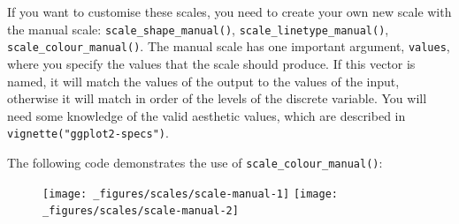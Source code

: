 If you want to customise these scales, you need to create your own new
scale with the manual scale: \texttt{scale\_shape\_manual()},
\texttt{scale\_linetype\_manual()}, \texttt{scale\_colour\_manual()}.
The manual scale has one important argument, \texttt{values}, where you
specify the values that the scale should produce. If this vector is
named, it will match the values of the output to the values of the
input, otherwise it will match in order of the levels of the discrete
variable. You will need some knowledge of the valid aesthetic values,
which are described in \texttt{vignette("ggplot2-specs")}.

The following code demonstrates the use of
\texttt{scale\_colour\_manual()}:

\begin{Shaded}
\begin{Highlighting}[]
\StringTok{ }\StringTok{ }
\StringTok{  }\NormalTok{() +}\StringTok{ }
\StringTok{  }\NormalTok{()}
\StringTok{ }
\StringTok{  }\NormalTok{(}\NormalTok{(} \StringTok{ }
\StringTok{  }\NormalTok{(}
     \NormalTok{(}\NormalTok{, }\NormalTok{, }\NormalTok{, }\NormalTok{), }
     
  \NormalTok{)}

\StringTok{ }\NormalTok{(}
   \NormalTok{, }
   \NormalTok{, }
   \NormalTok{, }
   
\NormalTok{)}
\StringTok{ }
\StringTok{  }\NormalTok{(}\NormalTok{(} \StringTok{ }
\StringTok{  }\NormalTok{(} 
\end{Highlighting}
\end{Shaded}

\begin{figure}[H]
  \texttt{[image: \_figures/scales/scale-manual-1]}%
  \texttt{[image: \_figures/scales/scale-manual-2]}
\end{figure}

